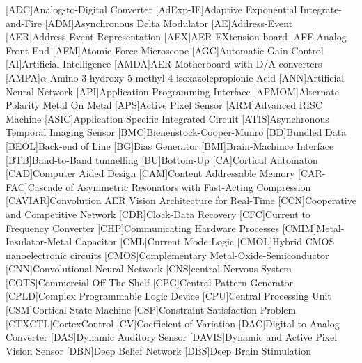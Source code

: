 [ADC]{Analog-to-Digital Converter}
[AdExp-IF]{Adaptive Exponential Integrate-and-Fire}
[ADM]{Asynchronous Delta Modulator}
[AE]{Address-Event}
[AER]{Address-Event Representation}
[AEX]{AER EXtension board}
[AFE]{Analog Front-End}
[AFM]{Atomic Force Microscope}
[AGC]{Automatic Gain Control}
[AI]{Artificial Intelligence}
[AMDA]{AER Motherboard with D/A converters}
[AMPA]{$\alpha$-Amino-3-hydroxy-5-methyl-4-isoxazolepropionic Acid}
[ANN]{Artificial Neural Network}
[API]{Application Programming Interface}
[APMOM]{Alternate Polarity Metal On Metal}
[APS]{Active Pixel Sensor}
[ARM]{Advanced RISC Machine}
[ASIC]{Application Specific Integrated Circuit}
[ATIS]{Asynchronous Temporal Imaging Sensor}
[BMC]{Bienenstock-Cooper-Munro}
[BD]{Bundled Data}
[BEOL]{Back-end of Line}
[BG]{Bias Generator}
[BMI]{Brain-Machince Interface}
[BTB]{Band-to-Band tunnelling}
[BU]{Bottom-Up}
[CA]{Cortical Automaton}
[CAD]{Computer Aided Design}
[CAM]{Content Addressable Memory}
[CAR-FAC]{Cascade of Asymmetric Resonators with Fast-Acting Compression}
[CAVIAR]{Convolution AER Vision Architecture for Real-Time}
[CCN]{Cooperative and Competitive Network}
[CDR]{Clock-Data Recovery}
[CFC]{Current to Frequency Converter}
[CHP]{Communicating Hardware Processes}
[CMIM]{Metal-Insulator-Metal Capacitor}
[CML]{Current Mode Logic}
[CMOL]{Hybrid CMOS nanoelectronic circuits}
[CMOS]{Complementary Metal-Oxide-Semiconductor}
[CNN]{Convolutional Neural Network}
[CNS]{central Nervous System}
[COTS]{Commercial Off-The-Shelf}
[CPG]{Central Pattern Generator}
[CPLD]{Complex Programmable Logic Device}
[CPU]{Central Processing Unit}
[CSM]{Cortical State Machine}
[CSP]{Constraint Satisfaction Problem}
[CTXCTL]{CortexControl}
[CV]{Coefficient of Variation}
[DAC]{Digital to Analog Converter}
[DAS]{Dynamic Auditory Sensor}
[DAVIS]{Dynamic and Active Pixel Vision Sensor}
[DBN]{Deep Belief Network}
[DBS]{Deep Brain Stimulation}
